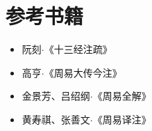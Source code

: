 \chapter{参考书籍}
\begin{itemize}
  \item 阮刻$\cdot$《十三经注疏》
  \item 高亨$\cdot$《周易大传今注》
  \item 金景芳、吕绍纲$\cdot$《周易全解》
  \item 黄寿祺、张善文$\cdot$《周易译注》
\end{itemize}

